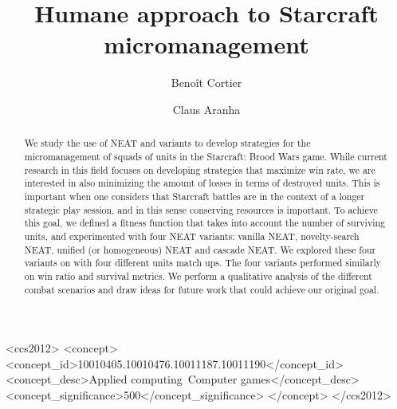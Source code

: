 \documentclass[sigconf, authordraft, anonymous]{acmart}
\begin{document}
\title{Humane approach to Starcraft micromanagement}

\author{Benoît Cortier}

\author{Claus Aranha}

\begin{abstract}
We study the use of NEAT and variants to develop strategies for the 
micromanagement of squads of units in the Starcraft: Brood Wars game. 
While current research in this field focuses on developing strategies 
that maximize win rate, we are interested in also minimizing the amount 
of losses in terms of destroyed units. This is important when one considers 
that Starcraft battles are in the context of a longer strategic play session, 
and in this sense conserving resources is important. To achieve this goal, 
we defined a fitness function that takes into account the number of 
surviving units, and experimented with four NEAT variants: vanilla NEAT, 
novelty-search NEAT, unified (or homogeneous) NEAT and cascade NEAT. We 
explored these four variants on with four different units match ups. The 
four variants performed similarly on win ratio and survival metrics. We 
perform a qualitative analysis of the different combat scenarios and draw 
ideas for future work that could achieve our original goal.
\end{abstract}

\begin{CCSXML}
<ccs2012>
<concept>
<concept_id>10010405.10010476.10011187.10011190</concept_id>
<concept_desc>Applied computing~Computer games</concept_desc>
<concept_significance>500</concept_significance>
</concept>
</ccs2012>
\end{CCSXML}


\end{document}
